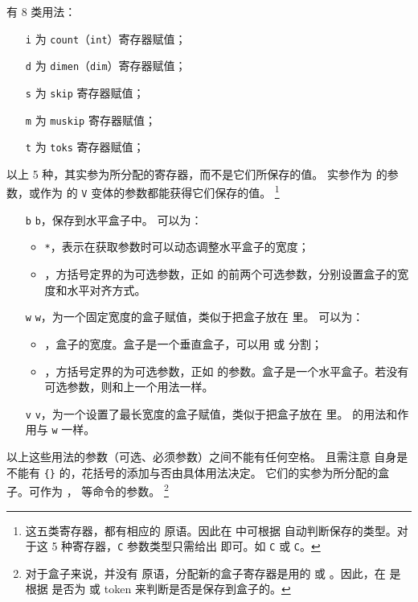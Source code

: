 \documentclass[openany]{book}
\begin{document}
 有 8 类用法：
\begin{itemize}
  \item[\texttt i] 为 \texttt{count}（\texttt{int}）寄存器赋值；
  \item[\texttt d] 为 \texttt{dimen}（\texttt{dim}）寄存器赋值；
  \item[\texttt s] 为 \texttt{skip} 寄存器赋值；
  \item[\texttt m] 为 \texttt{muskip} 寄存器赋值；
  \item[\texttt t] 为 \texttt{toks} 寄存器赋值；
\end{itemize}
以上 5 种，其实参为所分配的寄存器，而不是它们所保存的值。
实参作为  的参数，或作为 \LaTeXiii 的 \texttt V 变体的参数都能获得它们保存的值。
\footnote{这五类寄存器，都有相应的  原语。因此在  中可根据  自动判断保存的类型。对于这 5 种寄存器，\texttt C 参数类型只需给出  即可。如 \texttt C 或 \texttt C。}
\begin{itemize}
  \item[\texttt b] \texttt b，保存到水平盒子中。 可以为：
  \begin{itemize}
    \item \texttt{*}，表示在获取参数时可以动态调整水平盒子的宽度；
    \item {}，方括号定界的为可选参数，正如  的前两个可选参数，分别设置盒子的宽度和水平对齐方式。
  \end{itemize}
  \item[\texttt w] \texttt w，为一个固定宽度的盒子赋值，类似于把盒子放在  里。 可以为：
  \begin{itemize}
    \item {}，盒子的宽度。盒子是一个垂直盒子，可以用  或  分割；
    \item {}，方括号定界的为可选参数，正如  的参数。盒子是一个水平盒子。若没有可选参数，则和上一个用法一样。
  \end{itemize}
  \item[\texttt v] \texttt v，为一个设置了最长宽度的盒子赋值，类似于把盒子放在  里。 的用法和作用与 \texttt w 一样。
\end{itemize}
以上这些用法的参数（可选、必须参数）之间不能有任何空格。
且需注意  自身是不能有 \verb|{}| 的，花括号的添加与否由具体用法决定。
它们的实参为所分配的盒子。可作为 ， 等命令的参数。
\footnote{对于盒子来说，并没有  原语，分配新的盒子寄存器是用的  或 。因此，在  是根据  是否为  或  token 来判断是否是保存到盒子的。}
\end{document}
